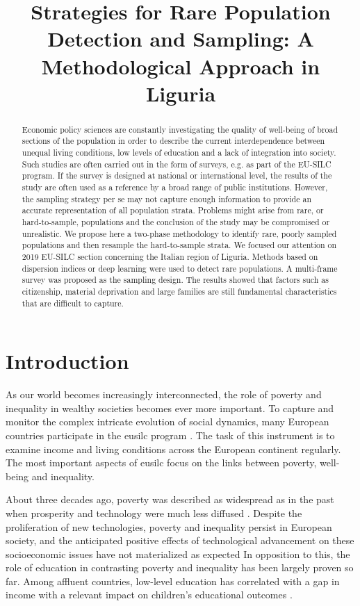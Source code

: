 
\title{Strategies for Rare Population Detection and Sampling: A Methodological Approach in Liguria}
\maketitle
\begin{abstract}
Economic policy sciences are constantly investigating the quality of well-being of broad sections of the population in order to describe the current interdependence between unequal living conditions, low levels of education and a lack of integration into society.
Such studies are often carried out in the form of surveys, e.g. as part of the EU-SILC program.
If the survey is designed at national or international level, the results of the study are often used as a reference by a broad range of public institutions.
However, the sampling strategy per se may not capture enough information to provide an accurate representation of all population strata.
Problems might arise from rare, or hard-to-sample, populations and the conclusion of the study may be compromised or unrealistic.
We propose here a two-phase methodology to identify rare, poorly sampled populations and then resample the hard-to-sample strata.
We focused our attention on 2019 EU-SILC section concerning
the Italian region of Liguria.
Methods based on dispersion indices or deep learning were used to detect rare populations.
A multi-frame survey was proposed as the sampling design.
The results showed that factors such as citizenship, material deprivation and large families are still fundamental characteristics that are difficult to capture. 
\end{abstract}


\section{Introduction}
As our world becomes increasingly interconnected, the role of poverty and inequality in wealthy societies becomes ever more important.
To capture and monitor the complex intricate evolution of social dynamics, many European countries participate in the \gls{eusilc} program \cite[]{EUSILC:2019}.
The task of this instrument is to examine income and living conditions across the European continent regularly. 
The most important aspects of \gls{eusilc} focus on the links between poverty, well-being and inequality.

About three decades ago, poverty was described as widespread as in the past when prosperity and technology were much less diffused \cite[]{atkinson1998world}.  
Despite the proliferation of new technologies, poverty and inequality persist in European society, and the anticipated positive effects of technological advancement on these socioeconomic issues have not materialized as expected \cite[]{longford2014statistical}
In opposition to this, the role of education in contrasting poverty and inequality has been largely proven so far\cite[]{hofmarcher2021effect, raffo2007education}. 
Among affluent countries, low-level education has correlated with a gap in income with a relevant impact on children's educational outcomes \cite[]{ferguson2007impact}. 

